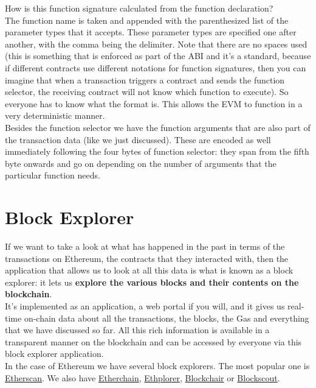 How is this function signature calculated from the function declaration?\\

The function name is taken and appended with the parenthesized list of the parameter types that it accepts.
These parameter types are specified one after another, with the comma being the delimiter.
Note that there are no spaces used (this is something that is enforced as part of the ABI and it's a standard, because if different contracts use different notations for function signatures, then you can imagine that when a transaction triggers a contract and sends the function selector, the receiving contract will not know which function to execute). 
So everyone has to know what the format is.
This allows the EVM to function in a very deterministic manner.\\

Besides the function selector we have the function arguments that are also part of the transaction data (like we just discussed).
These are encoded as well immediately following the four bytes of function selector: they span from the fifth byte onwards and go on depending on the number of arguments that the particular function needs.

\section{Block Explorer}
If we want to take a look at what has happened in the past in terms of the transactions on Ethereum, the contracts that they interacted with, then the application that allows us to look at all this data is what is known as a block explorer: it lets us \textbf{explore the various blocks and their contents on the blockchain}.\\

It's implemented as an application, a web portal if you will, and it gives us real-time on-chain data about all the transactions, the blocks, the Gas and everything that we have discussed so far.
All this rich information is available in a transparent manner on the blockchain and can be accessed by everyone via this block explorer application.\\

In the case of Ethereum we have several block explorers. The most popular one is \href{https://etherscan.io/}{Etherscan}. 
We also have \href{https://etherchain.org/}{Etherchain}, \href{https://ethplorer.io/}{Ethplorer}, \href{https://blockchair.com/}{Blockchair} or \href{https://blockscout.com/}{Blockscout}.

